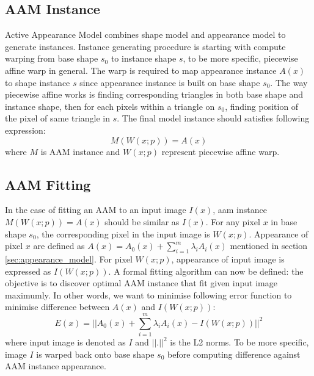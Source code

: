 \subsection{AAM Instance}
Active Appearance Model combines shape model and appearance model to generate instances. Instance generating procedure is starting with compute warping from base shape $s_0$ to instance shape $s$, to be more specific, piecewise affine warp in general. The warp is required to map appearance instance $A(x)$ to shape instance $s$ since appearance instance is built on base shape $s_0$. The way piecewise affine works is finding corresponding triangles in both base shape and instance shape, then for each pixels within a triangle on $s_0$, finding position of the pixel of same triangle in $s$. The final model instance should satisfies  following expression:
\begin{equation}
M(W(x;p))=A(x)
\end{equation}
where $M$ is AAM instance and $W(x;p)$ represent piecewise affine warp.

\subsection{AAM Fitting}
In the case of fitting an AAM to an input image $I(x)$, aam instance $M(W(x;p))=A(x)$ should be similar as $I(x)$. For any pixel $x$ in base shape $s_0$, the corresponding pixel in the input image is $W(x;p)$. Appearance of pixel $x$ are defined as $A(x)=A_0(x)+\sum^m_{i=1}\lambda_iA_i(x)$ mentioned in section \ref{sec:appearance_model}. For pixel $W(x;p)$, appearance of input image is expressed as $I(W(x;p))$. A formal fitting algorithm can now be defined: the objective is to discover optimal AAM instance that fit given input image maximumly. In other words, we want to minimise following error function to minimise difference between $A(x)$ and $I(W(x;p))$:
\begin{equation} 
\label{eq:aamfittingbase}
E(x)=||A_0(x)+\sum^m_{i=1}\lambda_iA_i(x)-I(W(x;p))||^2
\end{equation}
where input image is denoted as $I$ and $||.||^2$ is the L2 norms. To be more specific, image $I$ is warped back onto base shape $s_0$ before computing difference against AAM instance appearance.

